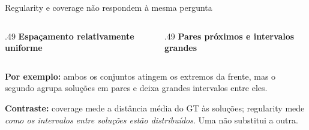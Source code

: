 \begin{frame}{Regularity e coverage não respondem à mesma pergunta}
\begin{columns}[T,onlytextwidth]
\begin{column}{.49\textwidth}\centering
\textbf{Espaçamento relativamente uniforme}\par\smallskip
{}
\end{column}
\begin{column}{.49\textwidth}\centering
\textbf{Pares próximos e intervalos grandes}\par\smallskip
{}
\end{column}
\end{columns}
\vspace{.14cm}
\textbf{Por exemplo:} ambos os conjuntos atingem os extremos da frente, mas o segundo agrupa soluções em pares e deixa grandes intervalos entre eles.
\par\medskip
\textbf{Contraste:} coverage mede a distância média do GT às soluções; regularity mede \emph{como os intervalos entre soluções estão distribuídos}. Uma não substitui a outra.
\end{frame}

